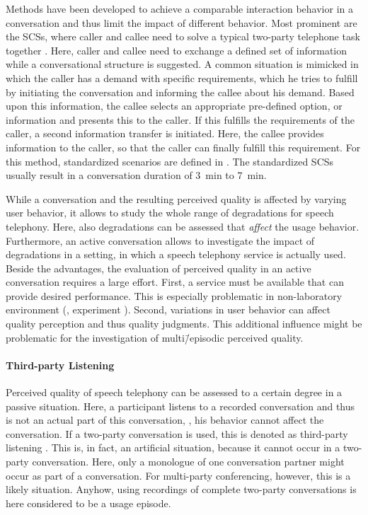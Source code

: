 Methods have been developed to achieve a comparable interaction behavior in a conversation and thus limit the impact of different behavior.
Most prominent are the \acp{SCS}, where caller and callee need to solve a typical two-party telephone task together \citep[][p.~76]{moller_assessment_2000}.
Here, caller and callee need to exchange a defined set of information while a conversational structure is suggested.
A common situation is mimicked in which the caller has a demand with specific requirements, which he tries to fulfill by initiating the conversation and informing the callee about his demand.
Based upon this information, the callee selects an appropriate pre-defined option, or information and presents this to the caller.
If this fulfills the requirements of the caller, a second information transfer is initiated.
Here, the callee provides information to the caller, so that the caller can finally fulfill this requirement.
For this method, standardized scenarios are defined in \citet{itu-t_recommendation_p.805_subjective_2007}.
The standardized \acp{SCS} usually result in a conversation duration of 3~min to 7~min.

While a conversation and the resulting perceived quality is affected by varying user behavior, it allows to study the whole range of degradations for speech telephony.
Here, also degradations can be assessed that \emph{affect} the usage behavior. %
Furthermore, an active conversation allows to investigate the impact of degradations in a setting, in which a speech telephony service is actually used.
Beside the advantages, the evaluation of perceived quality in an active conversation requires a large effort.
First, a service must be available that can provide desired performance.
This is especially problematic in non-laboratory environment (\cf, experiment ).
Second, variations in user behavior can affect quality perception and thus quality judgments.
This additional influence might be problematic for the investigation of multi\=/episodic perceived quality.

\paragraph*{Third-party Listening}
Perceived quality of speech telephony can be assessed  to a certain degree in a passive situation.
Here, a participant listens to a recorded conversation and thus is not an actual part of this conversation, \ie, his behavior cannot affect the conversation.
If a two-party conversation is used, this is denoted as third-party listening \citep[][p.~13]{itu-t_recommendation_p.832_subjective_2000}.
This is, in fact, an artificial situation, because it cannot occur in a two-party conversation.
Here, only a monologue of one conversation partner might occur as part of a conversation.
For multi-party conferencing, however, this is a likely situation.
Anyhow, using recordings of complete two-party conversations is here considered to be a usage episode.


